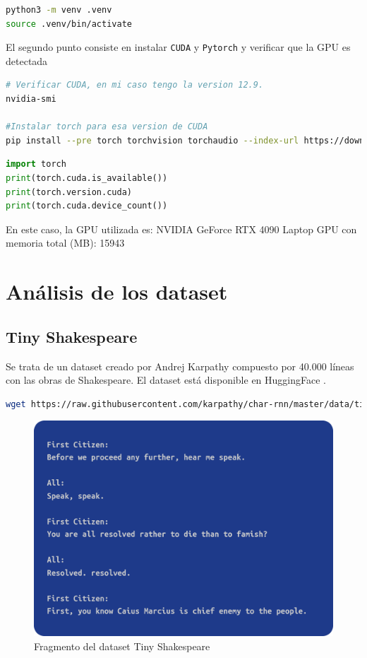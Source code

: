 \documentclass[11pt]{book}
\theoremstyle{plain}
\theoremstyle{definition}
\begin{document}
\begin{lstlisting}[language=bash]
python3 -m venv .venv
source .venv/bin/activate
\end{lstlisting}
El segundo punto consiste en instalar \texttt{CUDA} y \texttt{Pytorch} y verificar que la GPU es detectada
\begin{lstlisting}[language=bash]
# Verificar CUDA, en mi caso tengo la version 12.9.
nvidia-smi

#Instalar torch para esa version de CUDA
pip install --pre torch torchvision torchaudio --index-url https://download.pytorch.org/whl/nightly/cu129
\end{lstlisting}

\begin{lstlisting}[language=Python]
import torch
print(torch.cuda.is_available())
print(torch.version.cuda)
print(torch.cuda.device_count())
\end{lstlisting}
En este caso, la GPU utilizada es: NVIDIA GeForce RTX 4090 Laptop GPU con memoria total (MB): 15943

\section{Análisis de los dataset}
\subsection{Tiny Shakespeare}
Se trata de un dataset creado por Andrej Karpathy compuesto por 40.000 líneas con las obras de Shakespeare. El dataset está disponible en HuggingFace \parencite{huggingface_tinyshakespeare}.

\begin{lstlisting}[language=bash]
wget https://raw.githubusercontent.com/karpathy/char-rnn/master/data/tinyshakespeare/input.txt -O tinyshakespeare.txt
\end{lstlisting}
\begin{figure}[h]
    \centering
    \includegraphics[width=0.5\linewidth]{img/tiny_shakespeare.png}
    \caption{Fragmento del dataset Tiny Shakespeare}
    \label{fig:placeholder1}
\end{figure}
\end{document}
